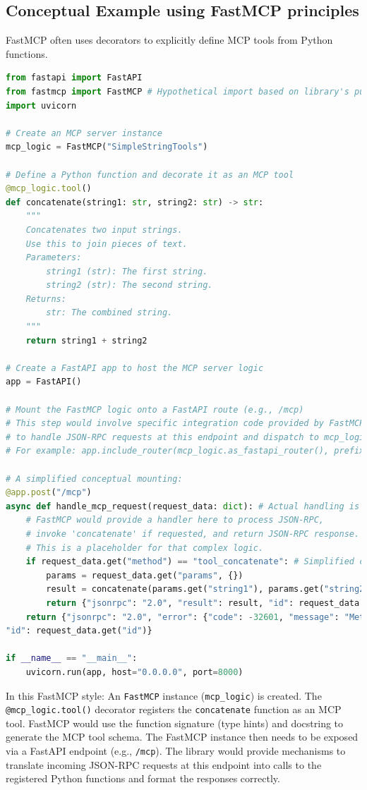 \subsection*{Conceptual Example using FastMCP principles}
FastMCP often uses decorators to explicitly define MCP tools from Python functions.
\begin{lstlisting}[language=Python]
from fastapi import FastAPI
from fastmcp import FastMCP # Hypothetical import based on library's purpose
import uvicorn

# Create an MCP server instance
mcp_logic = FastMCP("SimpleStringTools")

# Define a Python function and decorate it as an MCP tool
@mcp_logic.tool()
def concatenate(string1: str, string2: str) -> str:
    """
    Concatenates two input strings.
    Use this to join pieces of text.
    Parameters:
        string1 (str): The first string.
        string2 (str): The second string.
    Returns:
        str: The combined string.
    """
    return string1 + string2

# Create a FastAPI app to host the MCP server logic
app = FastAPI()

# Mount the FastMCP logic onto a FastAPI route (e.g., /mcp)
# This step would involve specific integration code provided by FastMCP
# to handle JSON-RPC requests at this endpoint and dispatch to mcp_logic.
# For example: app.include_router(mcp_logic.as_fastapi_router(), prefix="/mcp")

# A simplified conceptual mounting:
@app.post("/mcp")
async def handle_mcp_request(request_data: dict): # Actual handling is more complex
    # FastMCP would provide a handler here to process JSON-RPC,
    # invoke 'concatenate' if requested, and return JSON-RPC response.
    # This is a placeholder for that complex logic.
    if request_data.get("method") == "tool_concatenate": # Simplified check
        params = request_data.get("params", {})
        result = concatenate(params.get("string1"), params.get("string2"))
        return {"jsonrpc": "2.0", "result": result, "id": request_data.get("id")}
    return {"jsonrpc": "2.0", "error": {"code": -32601, "message": "Method not found"}, \
"id": request_data.get("id")}

if __name__ == "__main__":
    uvicorn.run(app, host="0.0.0.0", port=8000)
\end{lstlisting}
In this FastMCP style:
An \texttt{FastMCP} instance (\texttt{mcp\_logic}) is created. The \texttt{@mcp\_logic.tool()} decorator registers the \texttt{concatenate} 
function as an MCP tool. FastMCP would use the function signature (type hints) and docstring to generate the MCP tool schema.
 The FastMCP instance then needs to be exposed via a FastAPI endpoint (e.g., \texttt{/mcp}). 
 The library would provide mechanisms to translate incoming JSON-RPC requests at this endpoint into calls to the registered Python functions 
 and format the responses correctly.

